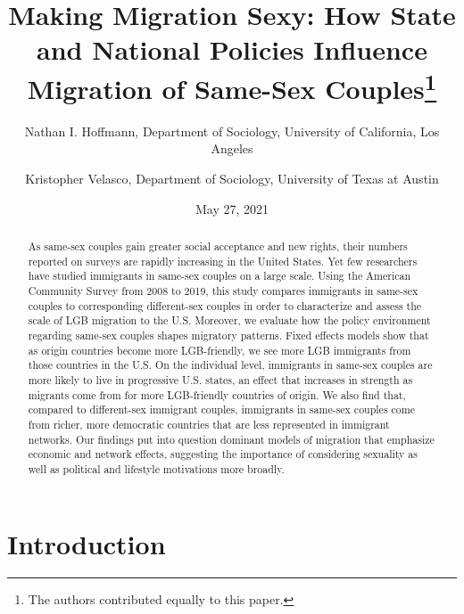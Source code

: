 \documentclass[
  11pt,
]{article}
\title{Making Migration Sexy: How State and National Policies Influence Migration of Same-Sex Couples\thanks{The authors contributed equally to this paper.}}
\author{Nathan I. Hoffmann, Department of Sociology, University of California, Los Angeles \and Kristopher Velasco, Department of Sociology, University of Texas at Austin}
\date{May 27, 2021}
\begin{document}
\maketitle
\begin{abstract}
As same-sex couples gain greater social acceptance and new rights, their numbers reported on surveys are rapidly increasing in the United States. Yet few researchers have studied immigrants in same-sex couples on a large scale. Using the American Community Survey from 2008 to 2019, this study compares immigrants in same-sex couples to corresponding different-sex couples in order to characterize and assess the scale of LGB migration to the U.S. Moreover, we evaluate how the policy environment regarding same-sex couples shapes migratory patterns. Fixed effects models show that as origin countries become more LGB-friendly, we see more LGB immigrants from those countries in the U.S. On the individual level, immigrants in same-sex couples are more likely to live in progressive U.S. states, an effect that increases in strength as migrants come from for more LGB-friendly countries of origin. We also find that, compared to different-sex immigrant couples, immigrants in same-sex couples come from richer, more democratic countries that are less represented in immigrant networks. Our findings put into question dominant models of migration that emphasize economic and network effects, suggesting the importance of considering sexuality as well as political and lifestyle motivations more broadly.
\end{abstract}

\hypertarget{introduction}{%
\section{Introduction}\label{introduction}}
\end{document}
